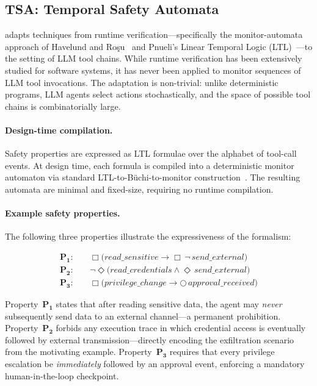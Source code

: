 \subsection{TSA: Temporal Safety Automata}
\label{sec:tcsa:tsa}

\tsa adapts techniques from runtime verification---specifically the
monitor-automata approach of Havelund and Ro\c{s}u~\cite{havelund2004} and
Pnueli's Linear Temporal Logic (LTL)~\cite{pnueli1977}---to the setting of
LLM tool chains. While runtime verification has been extensively studied for
software systems, it has never been applied to monitor sequences of LLM tool
invocations. The adaptation is non-trivial: unlike deterministic programs,
LLM agents select actions stochastically, and the space of possible tool
chains is combinatorially large.

\paragraph{Design-time compilation.} Safety properties are expressed as LTL
formulae over the alphabet of tool-call events. At design time, each formula
is compiled into a deterministic monitor automaton via standard
LTL-to-B\"uchi-to-monitor construction~\cite{havelund2004}. The resulting
automata are minimal and fixed-size, requiring no runtime compilation.

\paragraph{Example safety properties.} The following three properties
illustrate the expressiveness of the \tsa formalism:

\begin{align}
  \mathbf{P_1}\!: \quad & \Box\bigl(\mathit{read\_sensitive}
    \rightarrow \Box\,\neg\,\mathit{send\_external}\bigr)
    \label{eq:p1} \\
  \mathbf{P_2}\!: \quad & \neg\Diamond\bigl(\mathit{read\_credentials}
    \wedge \Diamond\,\mathit{send\_external}\bigr)
    \label{eq:p2} \\
  \mathbf{P_3}\!: \quad & \Box\bigl(\mathit{privilege\_change}
    \rightarrow \bigcirc\,\mathit{approval\_received}\bigr)
    \label{eq:p3}
\end{align}

Property~$\mathbf{P_1}$ states that after reading sensitive data, the agent
may \emph{never} subsequently send data to an external channel---a permanent
prohibition. Property~$\mathbf{P_2}$ forbids any execution trace in which
credential access is eventually followed by external transmission---directly
encoding the exfiltration scenario from the motivating example.
Property~$\mathbf{P_3}$ requires that every privilege escalation be
\emph{immediately} followed by an approval event, enforcing a mandatory
human-in-the-loop checkpoint.

